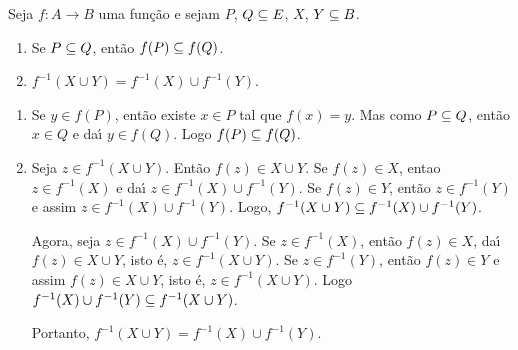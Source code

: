 \begin{proposicao}
	Seja $f : A \to B$ uma fun{\c c}{\~a}o e sejam $P$, $Q \subseteq E$, $X$, $Y \subseteq B$.
	\begin{enumerate}
		\item Se $P \subseteq Q$, ent{\~a}o $f(P) \subseteq f(Q)$.

		\item $f^{-1}(X \cup Y) = f^{-1}(X) \cup f^{-1}(Y)$.
	\end{enumerate}
\end{proposicao}
\begin{prova}
	\begin{enumerate}
		\item Se $y \in f(P)$, ent{\~a}o existe $x \in P$ tal que $f(x) = y$. Mas como $P \subseteq Q$, ent{\~a}o $x \in Q$ e da{\'\i} $y \in f(Q)$. Logo $f(P) \subseteq f(Q)$.

		\item Seja $z \in f^{-1}(X \cup Y)$. Ent{\~a}o $f(z) \in X \cup Y$. Se $f(z) \in X$, entao $z \in f^{-1}(X)$ e da{\'\i} $z \in f^{-1}(X) \cup f^{-1}(Y)$. Se $f(z) \in Y$, ent{\~a}o $z \in f^{-1}(Y)$ e assim $z \in f^{-1}(X) \cup f^{-1}(Y)$. Logo, $f^{-1}(X \cup Y) \subseteq f^{-1}(X) \cup f^{-1}(Y)$.

		Agora, seja $z \in f^{-1}(X) \cup f^{-1}(Y)$. Se $z \in f^{-1}(X)$, ent{\~a}o $f(z) \in X$, da{\'\i} $f(z) \in X \cup Y$, isto {\'e}, $z \in f^{-1}(X \cup Y)$. Se $z \in f^{-1}(Y)$, ent{\~a}o $f(z) \in Y$ e assim $f(z) \in X \cup Y$, isto {\'e}, $z \in f^{-1}(X \cup Y)$. Logo $f^{-1}(X) \cup f^{-1}(Y) \subseteq f^{-1}(X \cup Y)$.

		Portanto, $f^{-1}(X \cup Y) = f^{-1}(X) \cup f^{-1}(Y)$.
	\end{enumerate}
\end{prova}
